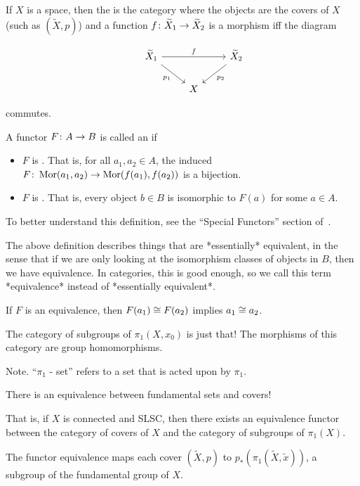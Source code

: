 \documentclass[11pt,leqno,oneside]{amsart}
\numberwithin{thm}{section}
\newcommand{\fund}[1][1]{\pi_{#1}}
\newcommand{\Mor}{\operatorname{Mor}}
\begin{document}
\begin{defn}
  If $X$ is a space, then the  is the category where the objects are the covers of $X$ (such as $(\widetilde{X}, p)$) and a function $f \colon \widetilde{X}_1 \to \widetilde{X}_2$ is a morphism iff the diagram

  $$\begin{tikzcd}
    &\widetilde{X}_1 \arrow[rd, "p_1"'] \arrow[rr, "f"] &&\widetilde{X}_2 \arrow[ld, "p_2"] \\
    &&X
  \end{tikzcd}$$

  commutes.
\end{defn}
\begin{defn}
  A functor $F \colon A \to B$ is called an  if
  \begin{itemize}
    \item $F$ is .  That is, for all $a_1, a_2 \in A$, the induced $F\from \Mor(a_1, a_2) \to \Mor(f(a_1), f(a_2))$ is a bijection.
    \item $F$ is .  That is, every object $b \in B$ is isomorphic to $F(a)$ for some $a \in A$.
  \end{itemize}
\end{defn}
\begin{rmk}
  To better understand this definition, see the ``Special Functors'' section of~\cite{functors}.

  The above definition describes things that are *essentially* equivalent, in the sense that if we are only looking at the isomorphism classes of objects in $B$, then we have equivalence.  In categories, this is good enough, so we call this term *equivalence* instead of *essentially equivalent*.
\end{rmk}
\begin{rmk}
  If $F$ is an equivalence, then $F(a_1) \mathrel{\cong} F(a_2)$ implies $a_1 \mathrel{\cong} a_2$.
\end{rmk}

\begin{defn}
  The {category of subgroups of $\fund(X, x_0)$} is just that!  The morphisms of this category are group homomorphisms.
\end{defn}

Note.  ``$\fund$ - set'' refers to a set that is acted upon by $\fund$.

\begin{thm}
  There is an equivalence between fundamental sets and covers!

  That is, if $X$ is connected and SLSC, then there exists an equivalence functor between the category of covers of $X$ and the category of subgroups of $\fund(X)$.

  The functor equivalence maps each cover $(\widetilde{X}, p)$ to $p_*(\fund(\widetilde{X}, \tilde{x}))$, a subgroup of the fundamental group of $X$.
\end{thm}
\end{document}
